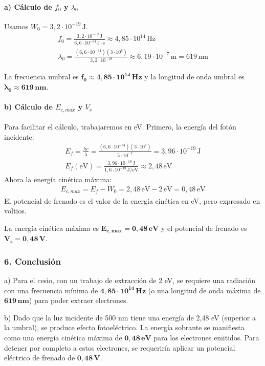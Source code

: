 \paragraph*{a) Cálculo de $f_0$ y $\lambda_0$}
Usamos $W_0 = 3,2\cdot10^{-19}\,\text{J}$.
\begin{gather}
    f_0 = \frac{3,2\cdot10^{-19}\,\text{J}}{6,6\cdot10^{-34}\,\text{J}\cdot\text{s}} \approx 4,85\cdot10^{14}\,\text{Hz} \\
    \lambda_0 = \frac{(6,6\cdot10^{-34})(3\cdot10^8)}{3,2\cdot10^{-19}} \approx 6,19\cdot10^{-7}\,\text{m} = 619\,\text{nm}
\end{gather}
\begin{cajaresultado}
    La frecuencia umbral es $\boldsymbol{f_0 \approx 4,85\cdot10^{14}\,\textbf{Hz}}$ y la longitud de onda umbral es $\boldsymbol{\lambda_0 \approx 619\,\textbf{nm}}$.
\end{cajaresultado}
\paragraph*{b) Cálculo de $E_{c,max}$ y $V_s$}
Para facilitar el cálculo, trabajaremos en eV. Primero, la energía del fotón incidente:
\begin{gather}
    E_f = \frac{hc}{\lambda} = \frac{(6,6\cdot10^{-34})(3\cdot10^8)}{5\cdot10^{-7}} = 3,96\cdot10^{-19}\,\text{J} \\
    E_f (\text{eV}) = \frac{3,96\cdot10^{-19}\,\text{J}}{1,6\cdot10^{-19}\,\text{J/eV}} \approx 2,48\,\text{eV}
\end{gather}
Ahora la energía cinética máxima:
\begin{gather}
    E_{c,max} = E_f - W_0 = 2,48\,\text{eV} - 2\,\text{eV} = 0,48\,\text{eV}
\end{gather}
El potencial de frenado es el valor de la energía cinética en eV, pero expresado en voltios.
\begin{cajaresultado}
    La energía cinética máxima es $\boldsymbol{E_{c,max} = 0,48\,\textbf{eV}}$ y el potencial de frenado es $\boldsymbol{V_s = 0,48\,\textbf{V}}$.
\end{cajaresultado}

\subsubsection*{6. Conclusión}
\begin{cajaconclusion}
a) Para el cesio, con un trabajo de extracción de 2 eV, se requiere una radiación con una frecuencia mínima de $\mathbf{4,85\cdot10^{14}\,Hz}$ (o una longitud de onda máxima de $\mathbf{619\,nm}$) para poder extraer electrones.

b) Dado que la luz incidente de 500 nm tiene una energía de 2,48 eV (superior a la umbral), se produce efecto fotoeléctrico. La energía sobrante se manifiesta como una energía cinética máxima de $\mathbf{0,48\,eV}$ para los electrones emitidos. Para detener por completo a estos electrones, se requeriría aplicar un potencial eléctrico de frenado de $\mathbf{0,48\,V}$.
\end{cajaconclusion}

\newpage 